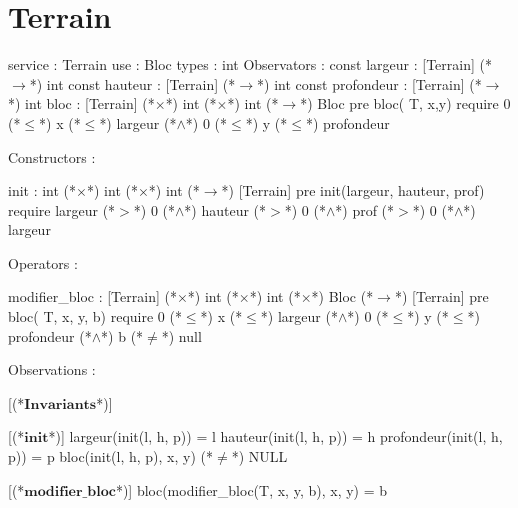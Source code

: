 \documentclass[a4paper, 11pt]{report}
\newcommand{\specB}[1]{\textbf{#1}}
\begin{document}
\section{Terrain}
\begin{Spe}
service : Terrain
use : Bloc
types : int
Observators :
	const largeur : [Terrain] (*$\rightarrow$*) int
	const hauteur : [Terrain] (*$\rightarrow$*) int
	const profondeur : [Terrain] (*$\rightarrow$*) int
	bloc : [Terrain] (*$\times$*) int (*$\times$*) int (*$\rightarrow$*) Bloc
		pre bloc( T, x,y) require 0 (*$\leq$*) x (*$\leq$*) largeur (*$\land$*) 0 (*$\leq$*) y (*$\leq$*) profondeur
             
Constructors :

	init : int (*$\times$*) int (*$\times$*) int (*$\rightarrow$*) [Terrain]
		pre init(largeur, hauteur, prof) require largeur (*$>$*) 0 (*$\land$*) hauteur (*$>$*) 0 (*$\land$*) prof (*$>$*) 0 (*$\land$*) largeur%
             
Operators : 

	modifier_bloc : [Terrain] (*$\times$*) int (*$\times$*) int (*$\times$*) Bloc (*$\rightarrow$*) [Terrain]
		pre bloc( T, x, y, b) require 0 (*$\leq$*) x (*$\leq$*) largeur (*$\land$*) 0 (*$\leq$*) y (*$\leq$*) profondeur (*$\land$*) b (*$\neq$*) null
             
Observations :

      [(*$\specB{Invariants}$*)]
      
      [(*$\specB{init}$*)]
            largeur(init(l, h, p)) = l
            hauteur(init(l, h, p)) = h
            profondeur(init(l, h, p)) = p
            bloc(init(l, h, p), x, y) (*$\neq$*) NULL
            
      [(*$\specB{modifier\_bloc}$*)]
            bloc(modifier_bloc(T, x, y, b), x, y) = b 
            
\end{Spe}
\end{document}
